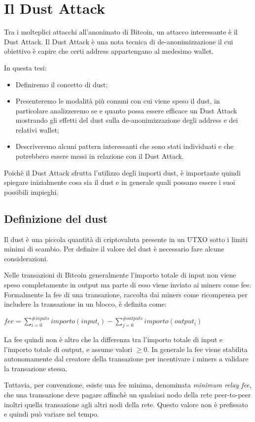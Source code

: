 \chapter{Il Dust Attack}
Tra i molteplici attacchi all'anonimato di Bitcoin, un attacco interessante è il Dust Attack. Il Dust Attack è una nota tecnica di de-anonimizzazione il cui obiettivo è capire che certi address appartengano al medesimo wallet.

In questa tesi:
\begin{itemize}
\item Definiremo il concetto di dust;
    \item Presenteremo le modalità più comuni con cui viene speso il dust, in particolare analizzeremo se e quanto possa essere efficace un Dust Attack mostrando gli effetti del dust sulla de-anonimizzazione degli address e dei relativi wallet;
    \item Descriveremo alcuni pattern interessanti che sono stati individuati e che potrebbero essere messi in relazione con il  Dust Attack.
\end{itemize}

Poichè il Dust Attack sfrutta l'utilizzo degli importi dust, è importante quindi spiegare inizialmente cosa sia il dust e in generale quali possano essere i suoi possibili impieghi.
\section{Definizione del dust}
Il dust è una piccola quantità di criptovaluta presente in un UTXO sotto i limiti minimi di scambio. Per definire il valore del dust è necessario fare alcune considerazioni.

Nelle transazioni di Bitcoin generalmente l'importo totale di input non viene speso completamente in output ma parte di esso viene inviato ai miners come fee. Formalmente la fee di una transazione, raccolta dai miners come ricompensa per includere la transazione in un blocco, è definita come:
\begin{center}
    $fee = \sum_{i=0}^{\#inputs} importo(input_i) - \sum_{j=0}^{\#outputs} importo(output_i)$
\end{center}
La fee quindi non è altro che la differenza tra l'importo totale di input e l'importo totale di output, e assume valori $\ge 0$. In generale la fee viene stabilita autonomamente dal creatore della transazione per incentivare i miners a validare la transazione stessa. 

Tuttavia, per convenzione, esiste una fee minima, denominata \textit{minimum relay fee}, che una transazione deve pagare affinchè un qualsiasi nodo della rete peer-to-peer inoltri quella transazione agli altri nodi della rete. Questo valore non è prefissato e quindi può variare nel tempo. 

